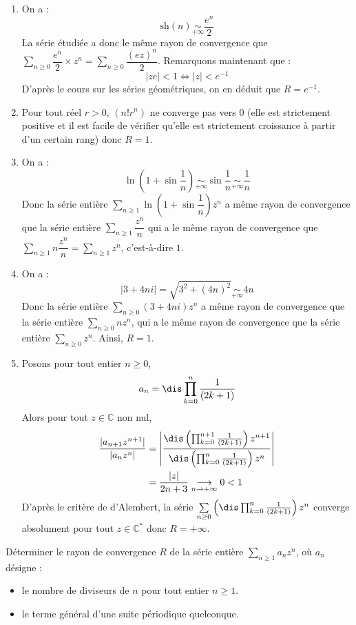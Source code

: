\documentclass[a4paper,10pt]{report}
\newcommand{\Sum}[2]{\ensuremath{\textstyle{\sum\limits_{#1}^{#2}}}}
\begin{document}
\begin{enumerate}
\item  On a :
$$\textrm{sh}(n) \underset{+ \infty}{\sim} \dfrac{e^n}{2}$$
La série étudiée a donc le même rayon de convergence que $\Sum{n \geq 0}{}  \dfrac{e^n}{2} \times z^n = \Sum{n \geq 0}{}  \dfrac{(ez)^n}{2}$. Remarquons maintenant que :
$$ \vert ze \vert < 1 \Longleftrightarrow \vert z \vert < e^{-1}$$
D'après le cours sur les séries géométriques, on en déduit que $R=e^{-1}$.
\item Pour tout réel $r>0$, $(n!r^n)$ ne converge pas vers $0$ (elle est strictement positive et il est facile de vérifier qu'elle est strictement croissance à partir d'un certain rang) donc $R=1$.
\item On a :
\[
\ln\left(1+\sin\dfrac{1}{n}\right)\underset{+\infty}{\sim}\sin\dfrac{1}{n}\underset{+\infty}{\sim}\dfrac{1}{n}
\]
Donc la série entière $\Sum{n \geq 1}{}\ln\left(1+\sin\dfrac{1}{n}\right)z^n$ a même rayon de convergence que la série entière $\Sum{n \geq 1}{} \dfrac{z^n}{n}$ qui a le même rayon de convergence que $\Sum{n \geq 1}{} n\dfrac{z^n}{n} = \Sum{n \geq 1}{} z^n$, c'est-à-dire $1$.
\item On a :
\[
\vert 3+4ni\vert=\sqrt{3^2+(4n)^2}\underset{+\infty}{\sim}4n
\]
Donc la série entière $\Sum{n \geq 0}{} (3+4ni)z^n$ a même rayon de convergence que la série entière $\Sum{n \geq 0}{} nz^n$, qui a le même rayon de convergence que la série entière $\Sum{n \geq 0}{} z^n$. Ainsi, $R=1$.
\item Posons pour tout entier $n \geq 0$,
$$a_n = \dis \prod_{k=0}^n\dfrac{1}{(2k+1)} $$
Alors pour tout $z \in \mathbb{C}$ non nul, 
\begin{align*}
\dfrac{\vert a_{n+1} z^{n+1} \vert }{\vert a_n z^n \vert} & =\left\vert\dfrac{\dis \left(\prod_{k=0}^{n+1}\frac{1}{(2k+1)}\right)z^{n+1}}{\dis \left(\prod_{k=0}^n\frac{1}{(2k+1)}\right)z^n}\right\vert \\
& =\dfrac{\vert z\vert }{2n+3}\underset{n \rightarrow +\infty}{\longrightarrow}0<1
\end{align*}
D'après le critère de d'Alembert, la série $\Sum{n \geq 0}{} \left(\dis \prod_{k=0}^n\frac{1}{(2k+1)}\right)z^n$ converge absolument pour tout $z\in\mathbb{C}^*$ donc $R=+\infty$. 
\end{enumerate}

\begin{Exercice}{} Déterminer le rayon de convergence $R$ de la série entière $\Sum{n\geq 1}{} a_n z^n$, où $a_n$ désigne : 
\begin{itemize}
\item le nombre de diviseurs de $n$ pour tout entier $n\geq 1$.
\item le terme général d'une suite périodique quelconque. 
\end{itemize}
\end{Exercice}
\end{document}
